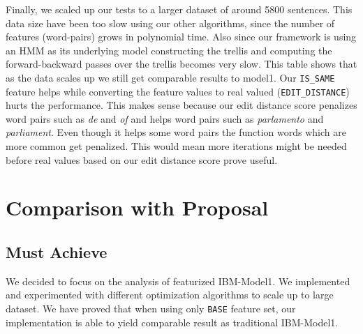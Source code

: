 \documentclass[11pt,letterpaper]{article}
\begin{document}
Finally, we scaled up our tests to a larger dataset of around 5800 sentences. This data size have been too slow using our other algorithms, since the number of features (word-pairs) grows in polynomial time. Also since our framework is using an HMM as its underlying model constructing the trellis and computing the forward-backward passes over the trellis becomes very slow. This table shows that as the data scales up we still get comparable results to model1. Our \texttt{IS\_SAME} feature helps while converting the feature values to real valued (\texttt{EDIT\_DISTANCE}) hurts the performance. This makes sense because our edit distance score penalizes word pairs such as \textit{de} and \textit{of} and helps word pairs such as \textit{parlamento} and \textit{parliament}. Even though it helps some word pairs the function words which are more common get penalized. This would mean more iterations might be needed before real values based on our edit distance score prove useful.
\begin{table}[h]
\centering
{}
\caption{\label{tab:sgdp} Performance FEM-SGD-P trained on 5K sentences (5 iterations) and tested on 200}
\end{table}
\section{Comparison with Proposal}
\subsection{Must Achieve}
We decided to focus on the analysis of featurized IBM-Model1. We implemented and experimented with different optimization algorithms to scale up to large dataset. We have proved that when using only \texttt{BASE} feature set, our implementation is able to yield comparable result as traditional IBM-Model1.
\end{document}
